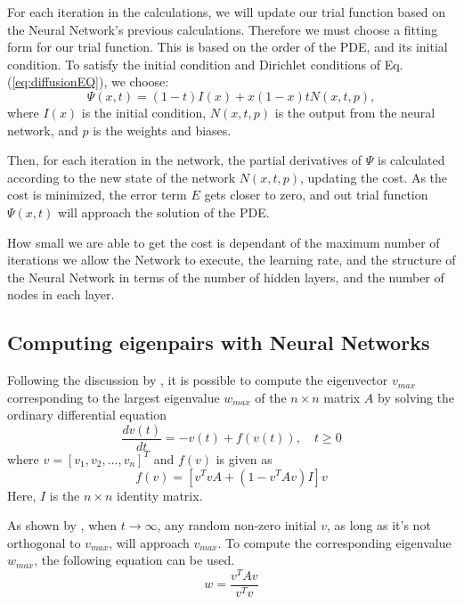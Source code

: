 For each iteration in the calculations, we will update our trial function based on the Neural Network's previous calculations. Therefore we must choose a fitting form for our trial function. This is based on the order of the PDE, and its initial condition. To satisfy the initial condition and Dirichlet conditions of Eq. (\ref{eq:diffusionEQ}), we choose:
\begin{equation}
    \Psi (x,t) = (1-t)I(x) + x(1-x)tN(x,t,p),
    \label{eq:trialFunction}
\end{equation}
where $I(x)$ is the initial condition, $N(x,t,p)$ is the output from the neural network, and $p$ is the weights and biases.

Then, for each iteration in the network, the partial derivatives of $\Psi$ is calculated according to the new state of the network $N(x, t, p)$, updating the cost. As the cost is minimized, the error term $E$ gets closer to zero, and out trial function $\Psi (x,t)$ will approach the solution of the PDE.

How small we are able to get the cost is dependant of the maximum number of iterations we allow the Network to execute, the learning rate, and the structure of the Neural Network in terms of the number of hidden layers, and the number of nodes in each layer.

\subsection{Computing eigenpairs with Neural Networks}
Following the discussion by \cite{yi2004neural}, it is possible to compute the eigenvector $v_{max}$ corresponding to the largest eigenvalue $w_{max}$ of the $n\times n$ matrix $A$ by solving the ordinary differential equation
\begin{equation}\label{eq:eigenDE}
	\frac{dv(t)}{dt} = -v(t) + f(v(t)), \quad t\geq 0
\end{equation}
 where $v = [v_1,v_2,\ldots,v_n]^T$ and $f(v)$ is given as
 \begin{equation}\label{eq:f}
 f(v) = \left[v^TvA + \left(1-v^TAv\right)I\right]v
 \end{equation}
Here, $I$ is the $n\times n$ identity matrix.

As shown by \cite{yi2004neural}, when $t\rightarrow \infty$, any random non-zero initial $v$, as long as it's not orthogonal to $v_{max}$, will approach $v_{max}$. To compute the corresponding eigenvalue $w_{max}$, the following equation can be used.
\begin{equation*}\label{eq:find_w}
	w = \frac{v^TAv}{v^Tv}
\end{equation*}

